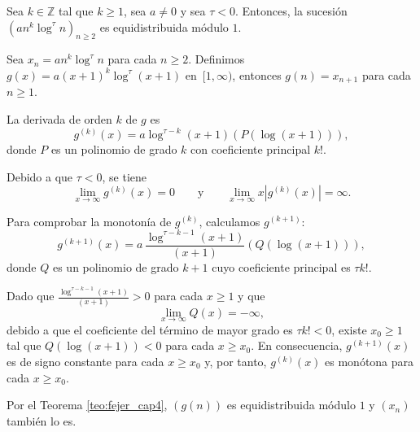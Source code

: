 \begin{example}
    Sea $k\in \mathbb{Z}$ tal que $k\geq1$, sea $a \neq 0$ y sea $\tau < 0$. 
    Entonces, la sucesión $(an^k\log^\tau n)_{n\geq2}$ es equidistribuida módulo $1$.
\end{example}

\begin{resolve}
    Sea $x_n = an^k\log^\tau n$ para cada $n \geq 2$. Definimos $g(x) = a(x+1)^k\log^\tau (x+1)$
    en~$[1,\infty)$, entonces $g(n) = x_{n+1}$ para cada $n \geq 1$.

    La derivada de orden $k$ de $g$ es
    \[
        g^{(k)}(x) = a \log^{\tau-k}(x+1)\left(P(\log(x+1))\right),
    \]
    donde $P$ es un polinomio de grado $k$ con coeficiente principal $k!$.

    Debido a que $\tau < 0$, se tiene 
    \[
        \lim_{x \to \infty} g^{(k)}(x) = 0
        \qquad \text{y} \qquad
        \lim_{x \to \infty} x \left|g^{(k)}(x)\right| = \infty.
    \]

    Para comprobar la monotonía de $g^{(k)}$, calculamos $g^{(k+1)}$:
    \[
        g^{(k+1)}(x) = a \,\frac{\log^{\tau-k-1}(x+1)}{(x+1)}\left(Q(\log(x+1))\right),
    \]
    donde $Q$ es un polinomio de grado $k+1$ cuyo coeficiente principal es $\tau k!$.

    Dado que $\frac{\log^{\tau-k-1}(x+1)}{(x+1)} > 0$ para cada $x \geq 1$ y que
    \[
        \lim_{x \to \infty} Q(x) = -\infty,
    \]
    debido a que el coeficiente del término de mayor grado es $\tau k!< 0$,
    existe $x_0 \geq 1$ tal que $Q(\log(x+1))<0$ para cada $x \geq x_0$. 
    En consecuencia, $g^{(k+1)}(x)$ es de signo constante para cada $x \geq x_0$ y, por tanto,
    $g^{(k)}(x)$ es monótona para cada $x \geq x_0$.

    Por el Teorema \ref{teo:fejer_cap4}, $(g(n))$ es equidistribuida módulo $1$ y 
    $(x_n)$ también lo es.
\end{resolve}